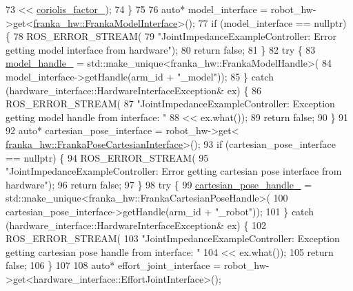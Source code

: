 \begin{DoxyCode}
73                     << \hyperlink{classfranka__example__controllers_1_1JointImpedanceExampleController_ae00b8cb710e3a41bc7cc1b1060f52d9e}{coriolis\_factor\_});
74   \}
75 
76   \textcolor{keyword}{auto}* model\_interface = robot\_hw->get<\hyperlink{classfranka__hw_1_1FrankaModelInterface}{franka\_hw::FrankaModelInterface}>();
77   \textcolor{keywordflow}{if} (model\_interface == \textcolor{keyword}{nullptr}) \{
78     ROS\_ERROR\_STREAM(
79         \textcolor{stringliteral}{"JointImpedanceExampleController: Error getting model interface from hardware"});
80     \textcolor{keywordflow}{return} \textcolor{keyword}{false};
81   \}
82   \textcolor{keywordflow}{try} \{
83     \hyperlink{classfranka__example__controllers_1_1JointImpedanceExampleController_a2ed243b27c3639ddeb284d7acdf76d8a}{model\_handle\_} = std::make\_unique<franka\_hw::FrankaModelHandle>(
84         model\_interface->getHandle(arm\_id + \textcolor{stringliteral}{"\_model"}));
85   \} \textcolor{keywordflow}{catch} (hardware\_interface::HardwareInterfaceException& ex) \{
86     ROS\_ERROR\_STREAM(
87         \textcolor{stringliteral}{"JointImpedanceExampleController: Exception getting model handle from interface: "}
88         << ex.what());
89     \textcolor{keywordflow}{return} \textcolor{keyword}{false};
90   \}
91 
92   \textcolor{keyword}{auto}* cartesian\_pose\_interface = robot\_hw->get<
      \hyperlink{classfranka__hw_1_1FrankaPoseCartesianInterface}{franka\_hw::FrankaPoseCartesianInterface}>();
93   \textcolor{keywordflow}{if} (cartesian\_pose\_interface == \textcolor{keyword}{nullptr}) \{
94     ROS\_ERROR\_STREAM(
95         \textcolor{stringliteral}{"JointImpedanceExampleController: Error getting cartesian pose interface from hardware"});
96     \textcolor{keywordflow}{return} \textcolor{keyword}{false};
97   \}
98   \textcolor{keywordflow}{try} \{
99     \hyperlink{classfranka__example__controllers_1_1JointImpedanceExampleController_ade68e268a35c4b1a52c0dc4c811a074f}{cartesian\_pose\_handle\_} = std::make\_unique<franka\_hw::FrankaCartesianPoseHandle>(
100         cartesian\_pose\_interface->getHandle(arm\_id + \textcolor{stringliteral}{"\_robot"}));
101   \} \textcolor{keywordflow}{catch} (hardware\_interface::HardwareInterfaceException& ex) \{
102     ROS\_ERROR\_STREAM(
103         \textcolor{stringliteral}{"JointImpedanceExampleController: Exception getting cartesian pose handle from interface: "}
104         << ex.what());
105     \textcolor{keywordflow}{return} \textcolor{keyword}{false};
106   \}
107 
108   \textcolor{keyword}{auto}* effort\_joint\_interface = robot\_hw->get<hardware\_interface::EffortJointInterface>();

\end{DoxyCode}
